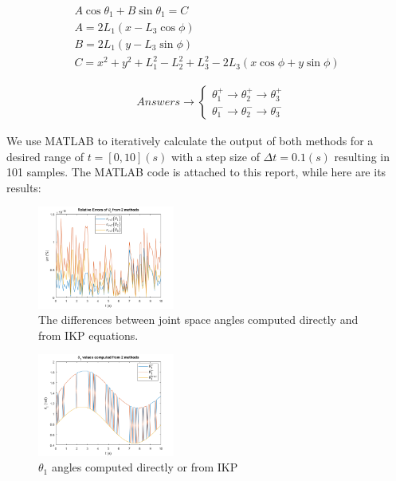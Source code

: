 \documentclass[conference]{IEEEtran}
\begin{document}
\begin{gather}
    A \cos \theta_1 + B \sin \theta_1 = C \label{eq:IKP} \\
    A = 2 L_1 (x - L_3 \cos \phi)         \\
    B = 2 L_1 (y - L_3 \sin \phi)         \\
    C = x^2 + y^2 + L_1^2 - L_2^2 + L_3^2 - 2 L_3 (x \cos \phi + y \sin \phi)
\end{gather}

\begin{large}
    \begin{align*}
         & Answers \longrightarrow
        \begin{cases}
            \theta_1 ^+ \longrightarrow\theta_2 ^+ \longrightarrow \theta_3 ^+ \\[20pt]
            \theta_1 ^- \longrightarrow\theta_2 ^- \longrightarrow \theta_3 ^-
        \end{cases}
    \end{align*}
\end{large}

We use MATLAB to iteratively calculate the output of both methods for a desired range of $t=[0, 10](s)$ with a step size of $\Delta t = 0.1(s)$ resulting in 101 samples. The MATLAB code is attached to this report, while here are its results:
\begin{figure}[htbp]
    \centerline{\includegraphics[width=0.4\textwidth]{figures/prob1a.png}}
    \caption{The differences between joint space angles computed directly and from IKP equations.}
    \label{fig:res1}
\end{figure}

\begin{figure}[htbp]
    \centerline{\includegraphics[width=0.4\textwidth]{figures/prob1b.png}}
    \caption{$\theta_1$ angles computed directly or from IKP}
    \label{fig:res2}
\end{figure}
\end{document}
